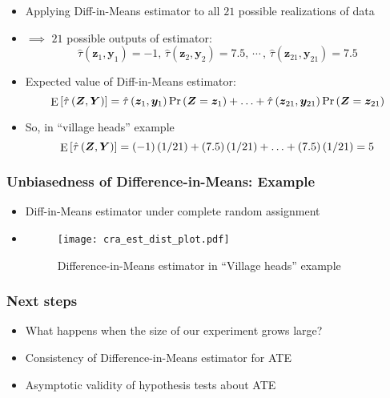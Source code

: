 \documentclass[table, xcolor = {dvipsnames}, 9pt]{beamer}
\theoremstyle{plain}
\DeclareMathOperator{\E}{\rm{E}}
\begin{document}
\begin{frame}
\begin{itemize}
\item Applying Diff-in-Means estimator to all $21$ possible realizations of data 
\item[] $\implies$ $21$ possible outputs of estimator: 
\begin{equation*}
\hat{\tau}\left(\bm{z}_1, \bm{y}_1\right) = -1, \, \hat{\tau}\left(\bm{z}_2, \bm{y}_2\right) = 7.5, \, \cdots \, , \, \hat{\tau}\left(\bm{z}_{21}, \bm{y}_{21}\right) = 7.5
\end{equation*} \pause
\item Expected value of Diff-in-Means estimator: 
\begin{equation*}
\E\left[\hat{\tau}\left(\bm{Z}, \bm{Y}\right)\right] = \hat{\tau}\left(\bm{z}_1, \bm{y}_1\right)\Pr\left(\bm{Z} = \bm{z}_1\right) + \ldots + \hat{\tau}\left(\bm{z}_{21}, \bm{y}_{21}\right)\Pr\left(\bm{Z} = \bm{z}_{21}\right)
\end{equation*} \pause
\item So, in ``village heads'' example 
$$\E\left[\hat{\tau}\left(\bm{Z}, \bm{Y}\right)\right] = (-1) \left(1/21\right) + (7.5) \left(1/21\right) + \ldots + (7.5) \left(1/21\right) = 5$$
\end{itemize}
\end{frame}
\begin{frame}
\frametitle{Unbiasedness of Difference-in-Means: Example}
\begin{itemize}
\item Diff-in-Means estimator under complete random assignment
\item[] 
\begin{figure}[H]
\texttt{[image: cra\_est\_dist\_plot.pdf]}
\caption{Difference-in-Means estimator in ``Village heads'' example}
\end{figure}
\end{itemize}
\end{frame}
\begin{frame}
\frametitle{Next steps}
\vfill
\begin{itemize} \vfill
\item What happens when the size of our experiment grows large? \vfill
\item Consistency of Difference-in-Means estimator for ATE \vfill
\item Asymptotic validity of hypothesis tests about ATE \vfill
\end{itemize} \vfill
\vfill
\end{frame}
\end{document}
